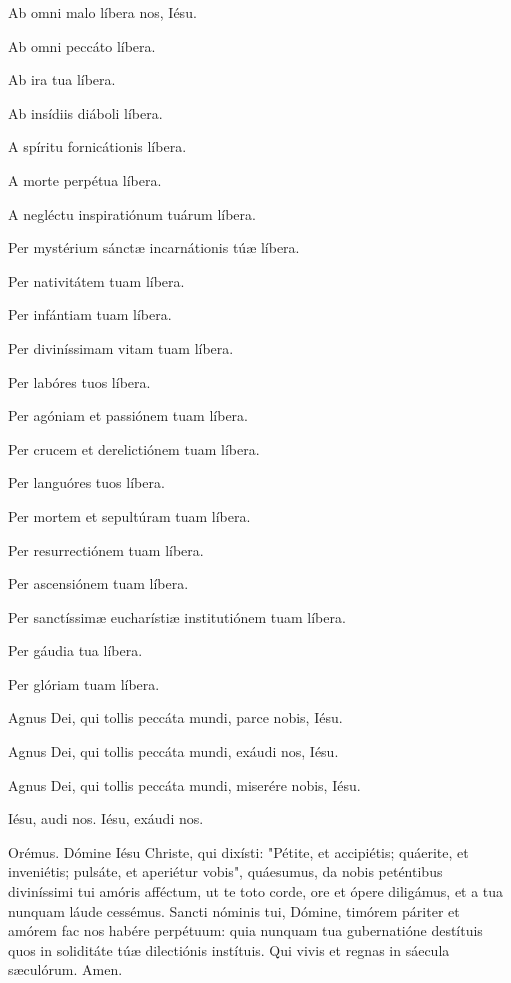 \documentclass[12pt,a6paper]{book}
\begin{document}
\begin{sloppy}
Ab omni malo líbera nos, Iésu.

Ab omni peccáto líbera.

Ab ira tua líbera.

Ab insídiis diáboli líbera.

A spíritu fornicátionis líbera.

A morte perpétua líbera.

A negléctu inspiratiónum tuárum líbera.

\vspace{3mm}

Per mystérium sánctæ incarnátionis túæ líbera.

Per nativitátem tuam líbera.

Per infántiam tuam líbera.

Per diviníssimam vitam tuam líbera.

Per labóres tuos líbera.

Per agóniam et passiónem tuam líbera.

Per crucem et derelictiónem tuam líbera.

Per languóres tuos líbera.

Per mortem et sepultúram tuam líbera.

Per resurrectiónem tuam líbera.

Per ascensiónem tuam líbera.

Per sanctíssimæ eucharístiæ institutiónem tuam líbera.

Per gáudia tua líbera.

Per glóriam tuam líbera.

\vspace{3mm}

Agnus Dei, qui tollis peccáta mundi, parce nobis, Iésu.

Agnus Dei, qui tollis peccáta mundi, exáudi nos, Iésu.

Agnus Dei, qui tollis peccáta mundi, miserére nobis, Iésu.

Iésu, audi nos. Iésu, exáudi nos.

Orémus. Dómine Iésu Christe, qui dixísti: "Pétite, et accipiétis; quáerite, et inveniétis; pulsáte, et aperiétur vobis", quáesumus, da nobis peténtibus diviníssimi tui amóris afféctum, ut te toto corde, ore et ópere diligámus, et a tua nunquam láude cessémus. Sancti nóminis tui, Dómine, timórem páriter et amórem fac nos habére perpétuum: quia nunquam tua gubernatióne destítuis quos in soliditáte túæ dilectiónis instítuis. Qui vivis et regnas in sáecula sæculórum. Amen.


\end{sloppy}
\end{document}
